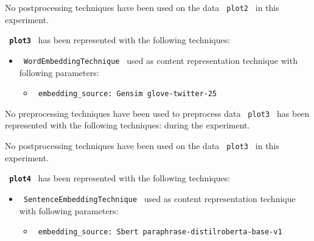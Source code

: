 \documentclass[11pt]{article}
\begin{document}
No postprocessing techniques have been used on the data \lstinline[style=verbatim-text]| plot2 | in this experiment.
\hfill\break
\hfill\break



\textbf{\lstinline[style=verbatim-text]| plot3 |} has been represented with the following techniques:
\hfill\break
\hfill\break

\begin{itemize}
                                                            
            \item
        \verb| WordEmbeddingTechnique | used as content representation technique with following parameters:
        \begin{itemize}
                            \item
                \verb| embedding_source: Gensim glove-twitter-25|
                    \end{itemize}
    \end{itemize}
\hfill\break
\hfill\break



No preprocessing techniques have been used to preprocess data \lstinline[style=verbatim-text]| plot3 | has been represented with the following techniques:
 during the experiment.
\hfill\break
\hfill\break



No postprocessing techniques have been used on the data \lstinline[style=verbatim-text]| plot3 | in this experiment.
\hfill\break
\hfill\break



\textbf{\lstinline[style=verbatim-text]| plot4 |} has been represented with the following techniques:
\hfill\break
\hfill\break

\begin{itemize}
                                                            
            \item
        \verb| SentenceEmbeddingTechnique | used as content representation technique with following parameters:
        \begin{itemize}
                            \item
                \verb| embedding_source: Sbert paraphrase-distilroberta-base-v1|
                    \end{itemize}
    \end{itemize}
\hfill\break
\hfill\break
\end{document}
